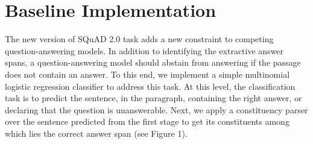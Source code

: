 \section{Baseline Implementation}

The new version of SQuAD 2.0 task adds a new constraint to competing question-answering models. In addition to identifying  the extractive answer spans, a question-answering model should abstain from answering if the passage does not contain an answer. To this end, we implement a simple multinomial logistic regression classifier to address this task. At this level, the classification task is to predict the sentence, in the paragraph, containing the right answer, or declaring that the question is unanswerable. Next, we apply a constituency parser over the sentence predicted from the first stage to get its constituents among which lies the correct answer span (see Figure 1).  

